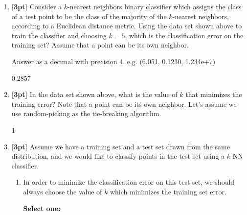 \begin{enumerate}
    \item \textbf{[3pt]} Consider a $k$-nearest neighbors binary classifier which assigns the class of a test point to be the class of the majority of the $k$-nearest neighbors, according to a Euclidean distance metric. Using the data set shown above to train the classifier and choosing $k=5$, which is the classification error on the training set? Assume that a point can be its own neighbor.
    
    Answer as a decimal with precision 4, e.g. (6.051, 0.1230, 1.234e+7)
    
    \begin{tcolorbox}[fit,height=1cm, width=4cm, blank, borderline={1pt}{-2pt},nobeforeafter]
    \begin{center}\huge0.2857\end{center}
    \end{tcolorbox}
 
    
    
    \item \textbf{[3pt]} In the data set shown above, what is the value of $k$ that minimizes the training error? Note that a point can be its own neighbor. Let’s assume we use random-picking as the tie-breaking algorithm.
    
    \begin{tcolorbox}[fit,height=1cm, width=4cm, blank, borderline={1pt}{-2pt},nobeforeafter]
    \begin{center}\huge1\end{center}
    \end{tcolorbox}

    
    
    \item \textbf{[3pt]} Assume we have a training set and a test set drawn from the same distribution, and we would like to classify points in the test set using a $k$-NN classifier. 
    
    \begin{enumerate}
        \item In order to minimize the classification error on this test set, we should always choose the value of $k$ which minimizes the training set error. 
    
    \textbf{Select one:}
    

\end{enumerate}
\end{enumerate}
